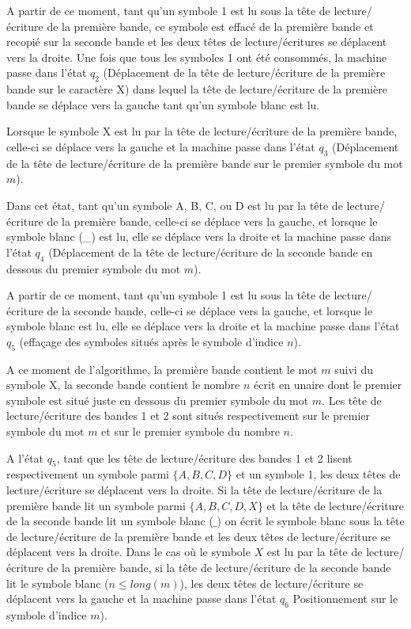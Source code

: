 \documentclass{report}
\begin{document}
A partir de ce moment, tant qu'un symbole 1 est lu sous la tête de lecture/écriture de la première bande, ce symbole est effacé de la première bande et recopié sur la seconde bande et les deux têtes de lecture/écritures se déplacent vers la droite.
Une fois que tous les symboles 1 ont été consommés, la machine passe dans l'état $q_2$ (Déplacement de la tête de lecture/écriture de la première bande sur le caractère X) dans lequel la tête de lecture/écriture de la première bande se déplace vers la gauche tant qu'un symbole blanc est lu.

Lorsque le symbole X est lu par la tête de lecture/écriture de la première bande, celle-ci se déplace vers la gauche et la machine passe dans l'état $q_3$ (Déplacement de la tête de lecture/écriture de la première bande sur le premier symbole du mot $m$).

Dans cet état, tant qu'un symbole A, B, C, ou D est lu par la tête de lecture/écriture de la première bande, celle-ci se déplace vers la gauche, et lorsque le symbole blanc (\_) est lu, elle se déplace vers la droite et la machine passe dans l'état $q_4$  (Déplacement de la tête de lecture/écriture de la seconde bande en dessous du premier symbole du mot $m$).

A partir de ce moment, tant qu'un symbole 1 est lu sous la tête de lecture/écriture de la seconde bande, celle-ci se déplace vers la gauche, et lorsque le symbole blanc est lu, elle se déplace vers la droite et la machine passe dans l'état $q_5$ (effaçage des symboles situés après le symbole d'indice $n$).

A ce moment de l'algorithme, la première bande contient le mot $m$ suivi du symbole X, la seconde bande contient le nombre $n$ écrit en unaire dont le premier symbole est situé juste en dessous du premier symbole du mot $m$. Les tête de lecture/écriture des bandes 1 et 2 sont situés respectivement sur le premier symbole du mot $m$ et sur le premier symbole du nombre $n$.

A l'état $q_5$, tant que les tête de lecture/écriture des bandes 1 et 2 lisent respectivement un symbole parmi $\{A, B, C, D\}$ et un symbole 1, les deux têtes de lecture/écriture se déplacent vers la droite. Si la tête de lecture/écriture de la première bande lit un symbole parmi $\{A, B, C, D, X\}$ et la tête de lecture/écriture de la seconde bande lit un symbole blanc ($\_$) on écrit le symbole blanc sous la tête de lecture/écriture de la première bande et les deux têtes de lecture/écriture se déplacent vers la droite. Dans le cas où le symbole $X$ est lu par la tête de lecture/écriture de la première bande, si la tête de lecture/écriture de la seconde bande lit le symbole blanc ($n \leq long(m)$), les deux têtes de lecture/écriture se déplacent vers la gauche et la machine passe dans l'état $q_6$ Positionnement sur le symbole d'indice $m$).
\end{document}
